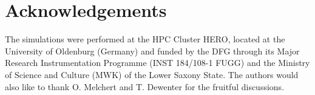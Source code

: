 \documentclass[pre,twocolumn,groupedaddress,showpacs,showkeys,amsmath,amssymb,floatfix]{revtex4-1}
\begin{document}
    \section{Acknowledgements}
        The simulations were performed at the HPC Cluster HERO, located at
        the University of Oldenburg (Germany) and funded by the DFG through
        its Major Research Instrumentation Programme (INST 184/108-1 FUGG)
        and the Ministry of Science and Culture (MWK) of the Lower Saxony
        State.
        The authors would also like to thank O. Melchert and T. Dewenter
        for the fruitful discussions.


    
\end{document}
